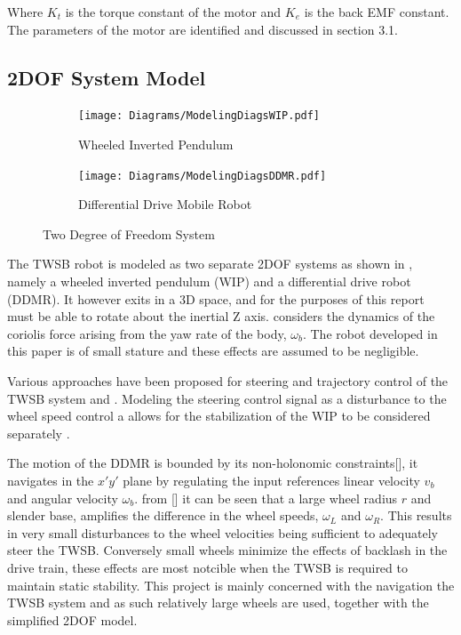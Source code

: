     Where $K_t$ is the torque constant of the motor and $K_e$ is the back EMF constant.
    The parameters of the motor are identified and discussed in section 3.1. 
    \pagebreak{}

    \subsection{2DOF System Model}

    \begin{figure}[h]
        \centering
        \begin{subfigure}[b]{0.4\textwidth}
            \texttt{[image: Diagrams/ModelingDiagsWIP.pdf]}
            \caption{Wheeled Inverted Pendulum}
            \label{fig:WIP}
        \end{subfigure}
        \hfill
        \begin{subfigure}[b]{0.4\textwidth}
            \texttt{[image: Diagrams/ModelingDiagsDDMR.pdf]}
            \caption{Differential Drive Mobile Robot}
            \label{fig:DDMR}
        \end{subfigure}
        \caption{Two Degree of Freedom System}
        \label{fig:2DOF}
    \end{figure}


    The TWSB robot is modeled as two separate 2DOF systems as shown in ,
    namely a wheeled inverted pendulum (WIP) and a differential drive robot (DDMR).
    It however exits in a 3D space, and for the purposes of this report must be able to rotate about the inertial Z axis. 
    \cite{kim2015dynamic} considers the dynamics of the coriolis force arising from the yaw rate of the body, $\omega_b$. 
    The robot developed in this paper is of small stature and these effects are assumed to be negligible.

    Various approaches have been proposed for steering and trajectory control of the TWSB 
    system \cite{yue2018efficient} \cite{micaelli1993trajectory} and \cite{pratama2015movement} 
    \cite{zhou2019turning}. Modeling the steering control signal as a disturbance to the wheel speed control a allows for
    the stabilization of the WIP  to be considered separately \cite{SelfContainedMobileTWSB}.

    The motion of the DDMR is bounded by its non-holonomic constraints[], it navigates in the $x' y'$ plane by
    regulating the input references linear velocity $v_b$ and angular velocity $\omega_{b}$. from [] it can be seen that 
    a large wheel radius $r$ and slender base, amplifies the difference in the wheel speeds, $\omega_L$ and $\omega_R$. 
    This results in very small disturbances to the wheel velocities being sufficient to adequately steer the TWSB. 
    Conversely small wheels minimize the effects of backlash in the drive train, these effects are most notcible when the TWSB 
    is required to maintain static stability. This project is mainly concerned with the 
    navigation the TWSB system and as such relatively large wheels are used, together with the simplified 2DOF model. 
    
